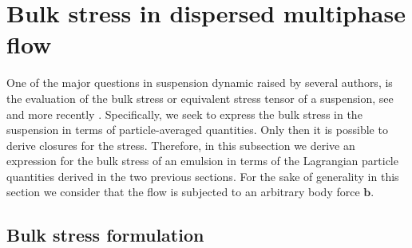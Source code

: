 

\section{Bulk stress in dispersed multiphase flow}
\label{sec:symetric_stress}


One of the major questions in suspension dynamic raised by several authors, is the evaluation of the bulk stress or equivalent stress tensor of a suspension, see \citep{batchelor1970stress, prosperetti2006stress,zhang1997momentum,nadim1996concise} and more recently \citet{dolata2020heterogeneous}. 
Specifically, we seek to express the bulk stress in the suspension in terms of particle-averaged quantities. 
Only then it is possible to derive closures for the stress. 
Therefore, in this subsection we derive an expression for the bulk stress of an emulsion in terms of the Lagrangian particle quantities derived in the two previous sections. 
For the sake of generality in this section we consider that the flow is subjected to an arbitrary body force $\textbf{b}$. 

\subsection{Bulk stress formulation}

